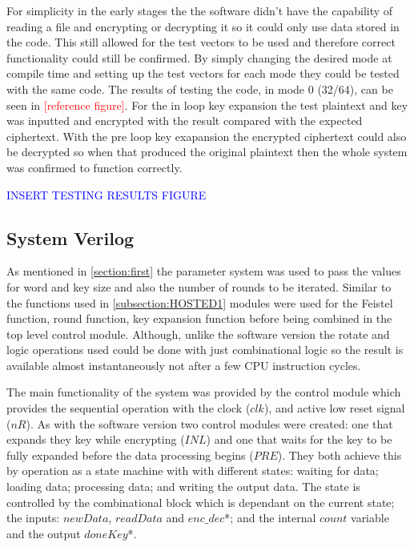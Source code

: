 \documentclass[12pt,twoside,a4paper]{report}
\begin{document}
	For simplicity in the early stages the the software didn't have the capability of reading a file and encrypting or decrypting it so it could only use data stored in the code. This still allowed for the test vectors to be used and therefore correct functionality could still be confirmed.  By simply changing the desired mode at compile time and setting up the test vectors for each mode they could be tested with the same code. The results of testing the code, in mode 0 (32/64), can be seen in \textcolor{red}{[reference figure]}. For the in loop key expansion the test plaintext and key was inputted and encrypted with the result compared with the expected ciphertext. With the pre loop key exapansion the encrypted ciphertext could also be decrypted so when that produced the original plaintext then the whole system was confirmed to function correctly.
	
	\textcolor{blue}{INSERT TESTING RESULTS FIGURE}
    
	\subsection{System Verilog}
	\label{subsection:SV1}
	As mentioned in \autoref{section:first} the parameter system was used to pass the values for word and key size and also the number of rounds to be iterated. Similar to the functions used in \autoref{subsection:HOSTED1} modules were used for the Feistel function, round function, key expansion function before being combined in the top level control module. Although, unlike the software version the rotate and logic operations used could be done with just combinational logic so the result is available almost instantaneously not after a few CPU instruction cycles.
	
	The main functionality of the system was provided by the control module which provides the sequential operation with the clock ($clk$), and active low reset signal ($nR$). As with the software version two control modules were created: one that expands they key while encrypting ($INL$) and one that waits for the key to be fully expanded before the data processing begins ($PRE$). They both achieve this by operation as a state machine with with different states: waiting for data; loading data; processing data; and writing the output data. The state is controlled by the combinational block which is dependant on the current state; the inputs: $newData$, $readData$ and $enc\_dec$*; and the internal $count$ variable and the output $doneKey$*.
	
\end{document}
